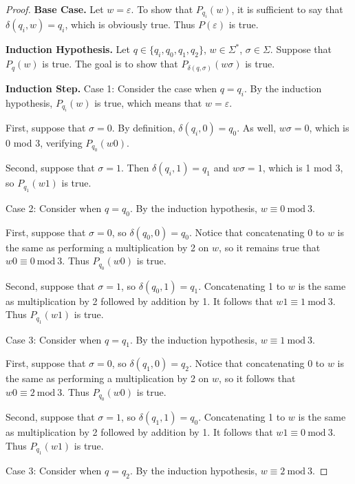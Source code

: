 \documentclass[11pt]{article}
\begin{document}
\begin{enumerate}[label=\textbf{Q\arabic*.}]
\begin{enumerate}[label=\textit{\alph*)}]
\begin{proof}
		\textbf{Base Case.} Let \(w = \varepsilon\). To show that \(P_{q_i}(w)\), it is sufficient to say that \(\delta (q_i, w) = q_i\), which is obviously true. Thus \(P(\varepsilon)\) is true.

		\medskip

		\textbf{Induction Hypothesis.} Let \(q \in \{q_i , q_0, q_1, q_2\}\), \(w \in \Sigma ^*\), \(\sigma \in \Sigma\). Suppose that \(P_q(w)\) is true. The goal is to show that \(P_{\delta (q,\sigma)}(w \sigma)\) is true.

		\medskip

		\textbf{Induction Step.} Case 1: Consider the case when \(q = q_i\). By the induction hypothesis, \(P_{q_i}(w)\) is true, which means that \(w = \varepsilon\).

		First, suppose that \(\sigma = 0\). By definition, \(\delta (q_i,0) = q_0\). As well, \(w \sigma = 0\), which is 0 mod 3, verifying \(P_{q_0}(w0)\).

		Second, suppose that \(\sigma = 1\). Then \(\delta (q_i, 1) = q_1\) and \(w \sigma = 1\), which is 1 mod 3, so \(P_{q_1}(w1)\) is true.

		Case 2: Consider when \(q = q_0\). By the induction hypothesis, \(w \equiv 0 \ \mathrm{mod} \ 3\).

		First, suppose that \(\sigma = 0\), so \(\delta (q_0, 0) = q_0\). Notice that concatenating 0 to \(w\) is the same as performing a multiplication by 2 on \(w\), so it remains true that \(w0 \equiv 0\ \mathrm{mod} \ 3\). Thus \(P_{q_0}(w0)\) is true.

		Second, suppose that \(\sigma = 1\), so \(\delta (q_0, 1) = q_1\). Concatenating 1 to \(w\) is the same as multiplication by 2 followed by addition by 1. It follows that \(w1 \equiv 1\ \mathrm{mod} \ 3\). Thus \(P_{q_1}(w1)\) is true.

		Case 3: Consider when \(q = q_1\). By the induction hypothesis, \(w \equiv 1\ \mathrm{mod} \ 3\).

		First, suppose that \(\sigma = 0\), so \(\delta (q_1, 0) = q_2\). Notice that concatenating 0 to \(w\) is the same as performing a multiplication by 2 on \(w\), so it follows that \(w0 \equiv 2\ \mathrm{mod} \ 3\). Thus \(P_{q_0}(w0)\) is true.

		Second, suppose that \(\sigma = 1\), so \(\delta (q_1, 1) = q_0\). Concatenating 1 to \(w\) is the same as multiplication by 2 followed by addition by 1. It follows that \(w1 \equiv 0\ \mathrm{mod} \ 3\). Thus \(P_{q_1}(w1)\) is true.

		Case 3: Consider when \(q = q_2\). By the induction hypothesis, \(w \equiv 2\ \mathrm{mod} \ 3\).


\end{proof}
\end{enumerate}
\end{enumerate}
\end{document}

